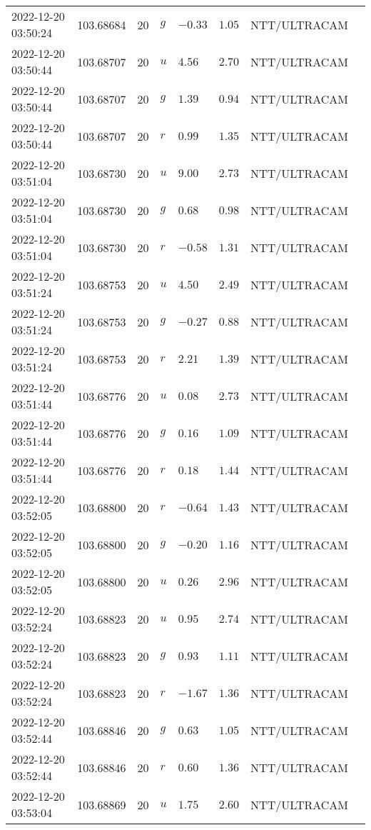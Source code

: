 \documentclass{nature_plusfigure}
\begin{document}
\begin{supplement}
\begin{center}
\begin{longtable}{llllllll}
2022-12-20 03:50:24 & 103.68684 & 20 & $g$ & $-0.33$ & $1.05$ & NTT/ULTRACAM &  \\ 
2022-12-20 03:50:44 & 103.68707 & 20 & $u$ & $4.56$ & $2.70$ & NTT/ULTRACAM &  \\ 
2022-12-20 03:50:44 & 103.68707 & 20 & $g$ & $1.39$ & $0.94$ & NTT/ULTRACAM &  \\ 
2022-12-20 03:50:44 & 103.68707 & 20 & $r$ & $0.99$ & $1.35$ & NTT/ULTRACAM &  \\ 
2022-12-20 03:51:04 & 103.68730 & 20 & $u$ & $9.00$ & $2.73$ & NTT/ULTRACAM &  \\ 
2022-12-20 03:51:04 & 103.68730 & 20 & $g$ & $0.68$ & $0.98$ & NTT/ULTRACAM &  \\ 
2022-12-20 03:51:04 & 103.68730 & 20 & $r$ & $-0.58$ & $1.31$ & NTT/ULTRACAM &  \\ 
2022-12-20 03:51:24 & 103.68753 & 20 & $u$ & $4.50$ & $2.49$ & NTT/ULTRACAM &  \\ 
2022-12-20 03:51:24 & 103.68753 & 20 & $g$ & $-0.27$ & $0.88$ & NTT/ULTRACAM &  \\ 
2022-12-20 03:51:24 & 103.68753 & 20 & $r$ & $2.21$ & $1.39$ & NTT/ULTRACAM &  \\ 
2022-12-20 03:51:44 & 103.68776 & 20 & $u$ & $0.08$ & $2.73$ & NTT/ULTRACAM &  \\ 
2022-12-20 03:51:44 & 103.68776 & 20 & $g$ & $0.16$ & $1.09$ & NTT/ULTRACAM &  \\ 
2022-12-20 03:51:44 & 103.68776 & 20 & $r$ & $0.18$ & $1.44$ & NTT/ULTRACAM &  \\ 
2022-12-20 03:52:05 & 103.68800 & 20 & $r$ & $-0.64$ & $1.43$ & NTT/ULTRACAM &  \\ 
2022-12-20 03:52:05 & 103.68800 & 20 & $g$ & $-0.20$ & $1.16$ & NTT/ULTRACAM &  \\ 
2022-12-20 03:52:05 & 103.68800 & 20 & $u$ & $0.26$ & $2.96$ & NTT/ULTRACAM &  \\ 
2022-12-20 03:52:24 & 103.68823 & 20 & $u$ & $0.95$ & $2.74$ & NTT/ULTRACAM &  \\ 
2022-12-20 03:52:24 & 103.68823 & 20 & $g$ & $0.93$ & $1.11$ & NTT/ULTRACAM &  \\ 
2022-12-20 03:52:24 & 103.68823 & 20 & $r$ & $-1.67$ & $1.36$ & NTT/ULTRACAM &  \\ 
2022-12-20 03:52:44 & 103.68846 & 20 & $g$ & $0.63$ & $1.05$ & NTT/ULTRACAM &  \\ 
2022-12-20 03:52:44 & 103.68846 & 20 & $r$ & $0.60$ & $1.36$ & NTT/ULTRACAM &  \\ 
2022-12-20 03:53:04 & 103.68869 & 20 & $u$ & $1.75$ & $2.60$ & NTT/ULTRACAM &  \\ 

\end{longtable}
\end{center}
\end{supplement}
\end{document}
